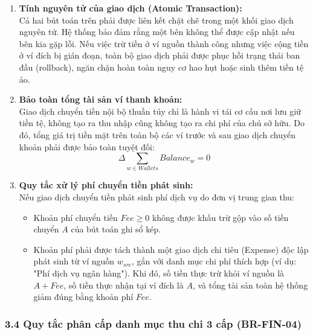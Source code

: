 \documentclass[11pt,a4paper]{article}
\providecommand{\tightlist}{
  \setlength{\itemsep}{0pt}\setlength{\parskip}{0pt}}
\begin{document}
\begin{enumerate}
  \begin{itemize}
  \tightlist
  \item
    Bút toán ghi giảm (Debit): Trừ chính xác số tiền \(A\) khỏi số dư
    khả dụng của ví nguồn \(w_{src}\).
  \item
    Bút toán ghi tăng (Credit): Cộng chính xác số tiền \(A\) vào số dư
    khả dụng của ví đích \(w_{dst}\).
  \end{itemize}
\item
  \textbf{Tính nguyên tử của giao dịch (Atomic Transaction):}\\
  Cả hai bút toán trên phải được liên kết chặt chẽ trong một khối giao
  dịch nguyên tử. Hệ thống bảo đảm rằng một bên không thể được cập nhật
  nếu bên kia gặp lỗi. Nếu việc trừ tiền ở ví nguồn thành công nhưng
  việc cộng tiền ở ví đích bị gián đoạn, toàn bộ giao dịch phải được
  phục hồi trạng thái ban đầu (rollback), ngăn chặn hoàn toàn nguy cơ
  hao hụt hoặc sinh thêm tiền tệ ảo.
\item
  \textbf{Bảo toàn tổng tài sản ví thanh khoản:}\\
  Giao dịch chuyển tiền nội bộ thuần túy chỉ là hành vi tái cơ cấu nơi
  lưu giữ tiền tệ, không tạo ra thu nhập cũng không tạo ra chi phí của
  chủ sở hữu. Do đó, tổng giá trị tiền mặt trên toàn bộ các ví trước và
  sau giao dịch chuyển khoản phải được bảo toàn tuyệt đối:
  \[
  \Delta\sum_{w\in Wallets} Balance_w = 0
  \]
\item
  \textbf{Quy tắc xử lý phí chuyển tiền phát sinh:}\\
  Nếu giao dịch chuyển tiền phát sinh phí dịch vụ do đơn vị trung gian
  thu:

  \begin{itemize}
  \tightlist
  \item
    Khoản phí chuyển tiền \(Fee \ge 0\) không được khấu trừ gộp vào số
    tiền chuyển \(A\) của bút toán ghi sổ kép.
  \item
    Khoản phí phải được tách thành một giao dịch chi tiêu (Expense) độc
    lập phát sinh từ ví nguồn \(w_{src}\), gắn với danh mục chi phí
    thích hợp (ví dụ: "Phí dịch vụ ngân hàng"). Khi đó, số tiền thực trừ
    khỏi ví nguồn là \(A + Fee\), số tiền thực nhận tại ví đích là
    \(A\), và tổng tài sản toàn hệ thống giảm đúng bằng khoản phí
    \(Fee\).
  \end{itemize}
\end{enumerate}

\newpage

\subsubsection{3.4 Quy tắc phân cấp danh mục thu chi 3 cấp
(BR-FIN-04)}\label{34-quy-tux1eafc-phuxe2n-cux1ea5p-danh-mux1ee5c-thu-chi-3-cux1ea5p-br-fin-04}
\end{document}
